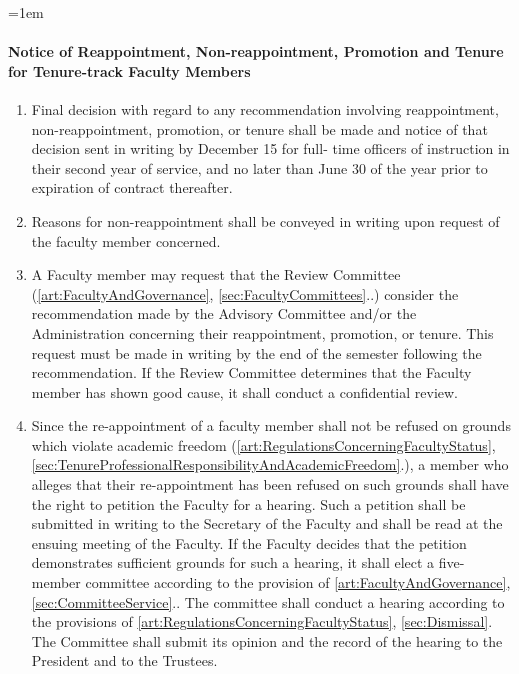 \documentclass{manual}
\let\oldparagraph\paragraph
\renewcommand\paragraph{\leftskip=1em\oldparagraph}
\newcommand{\itemLevelA}{\alph*.}
\newcommand{\itemRefA}{\alph*}
\begin{document}
\paragraph{Notice of Reappointment, Non-reappointment, Promotion and Tenure for Tenure-track Faculty Members}

\begin{enumerate}[label=\itemLevelA,ref=\itemRefA]

\item Final decision with regard to any recommendation involving reappointment, non-reappointment, promotion, or tenure shall be made and notice of that decision sent in writing by December 15 for full- time officers of instruction in their second year of service, and no later than June 30 of the year prior to expiration of contract thereafter.

\item Reasons for non-reappointment shall be conveyed in writing upon request of the faculty member concerned.

\item A Faculty member may request that the Review Committee (\cref{art:FacultyAndGovernance}, \cref{sec:FacultyCommittees}..) consider the recommendation made by the Advisory Committee and/or the Administration concerning their reappointment, promotion, or tenure. This request must be made in writing by the end of the semester following the recommendation. If the Review Committee determines that the Faculty member has shown good cause, it shall conduct a confidential review.

\item Since the re-appointment of a faculty member shall not be refused on grounds which violate academic freedom (\cref{art:RegulationsConcerningFacultyStatus}, \cref{sec:TenureProfessionalResponsibilityAndAcademicFreedom}.), a member who alleges that their re-appointment has been refused on such grounds shall have the right to petition the Faculty for a hearing. Such a petition shall be submitted in writing to the Secretary of the Faculty and shall be read at the ensuing meeting of the Faculty. If the Faculty decides that the petition demonstrates sufficient grounds for such a hearing, it shall elect a five-member committee according to the provision of \cref{art:FacultyAndGovernance}, \cref{sec:CommitteeService}.. The committee shall conduct a hearing according to the provisions of \cref{art:RegulationsConcerningFacultyStatus}, \cref{sec:Dismissal}. The Committee shall submit its opinion and the record of the hearing to the President and to the Trustees.
\end{enumerate}
\end{document}
